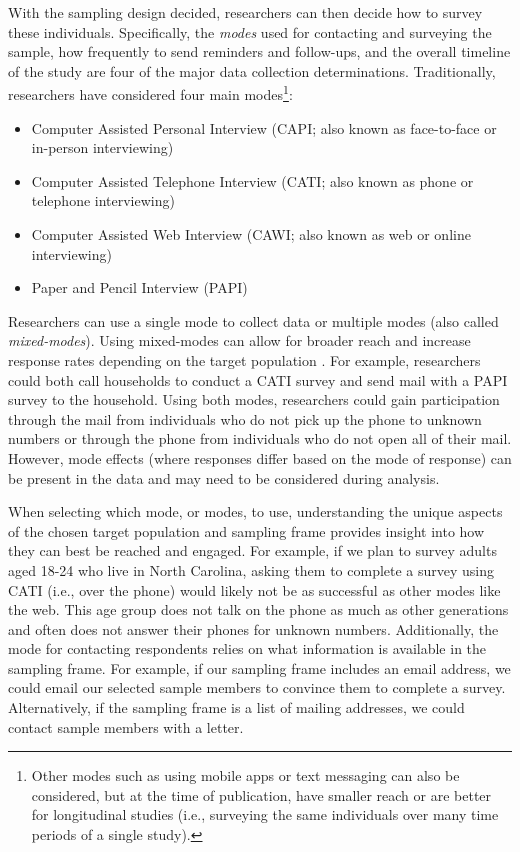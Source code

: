 \documentclass[
]{krantz}
\providecommand{\tightlist}{%
  \setlength{\itemsep}{0pt}\setlength{\parskip}{0pt}}
\begin{document}
With the sampling design decided, researchers can then decide how to survey these individuals. Specifically, the \emph{modes} used for contacting and surveying the sample, how frequently to send reminders and follow-ups, and the overall timeline of the study are four of the major data collection determinations. Traditionally, researchers have considered four main modes\footnote{Other modes such as using mobile apps or text messaging can also be considered, but at the time of publication, have smaller reach or are better for longitudinal studies (i.e., surveying the same individuals over many time periods of a single study).}:

\begin{itemize}
\tightlist
\item
  Computer Assisted Personal Interview (CAPI; also known as face-to-face or in-person interviewing)
\item
  Computer Assisted Telephone Interview (CATI; also known as phone or telephone interviewing)
\item
  Computer Assisted Web Interview (CAWI; also known as web or online interviewing)
\item
  Paper and Pencil Interview (PAPI)
\end{itemize}

Researchers can use a single mode to collect data or multiple modes (also called \emph{mixed-modes}). Using mixed-modes can allow for broader reach and increase response rates depending on the target population \citep{deLeeuw2005, DeLeeuw_2018, biemer_choiceplus}. For example, researchers could both call households to conduct a CATI survey and send mail with a PAPI survey to the household. Using both modes, researchers could gain participation through the mail from individuals who do not pick up the phone to unknown numbers or through the phone from individuals who do not open all of their mail. However, mode effects (where responses differ based on the mode of response) can be present in the data and may need to be considered during analysis.

When selecting which mode, or modes, to use, understanding the unique aspects of the chosen target population and sampling frame provides insight into how they can best be reached and engaged. For example, if we plan to survey adults aged 18-24 who live in North Carolina, asking them to complete a survey using CATI (i.e., over the phone) would likely not be as successful as other modes like the web. This age group does not talk on the phone as much as other generations and often does not answer their phones for unknown numbers. Additionally, the mode for contacting respondents relies on what information is available in the sampling frame. For example, if our sampling frame includes an email address, we could email our selected sample members to convince them to complete a survey. Alternatively, if the sampling frame is a list of mailing addresses, we could contact sample members with a letter.
\end{document}
